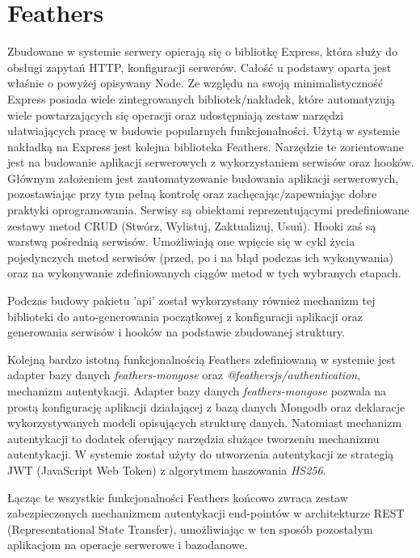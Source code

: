 \section{Feathers}
Zbudowane w systemie serwery opierają się o bibliotkę Express, która służy do obsługi zapytań HTTP, konfiguracji serwerów. Całość u podstawy oparta jest właśnie o powyżej opisywany Node. Ze względu na swoją minimalistyczność Express posiada wiele zintegrowanych bibliotek/nakładek, które automatyzują wiele powtarzających się operacji oraz udostępniają zestaw narzędzi ułatwiających pracę w budowie popularnych funkcjonalności. Użytą w systemie nakładką na Express jest kolejna biblioteka Feathers. Narzędzie te zorientowane jest na budowanie aplikacji serwerowych z wykorzystaniem serwisów oraz hooków. Głównym założeniem jest zautomatyzowanie budowania aplikacji serwerowych, pozostawiając przy tym pełną kontrolę oraz zachęcając/zapewniając dobre praktyki oprogramowania. Serwisy są obiektami reprezentującymi predefiniowane zestawy metod CRUD (Stwórz, Wylistuj, Zaktualizuj, Usuń). Hooki zaś są warstwą pośrednią serwisów. Umożliwiają one wpięcie się w cykl życia pojedynczych metod serwisów (przed, po i na błąd podczas ich wykonywania) oraz na wykonywanie zdefiniowanych ciągów metod w tych wybranych etapach. \cite{FeathersDocs}

Podczas budowy pakietu 'api' został wykorzystany również mechanizm tej biblioteki do auto-generowania początkowej z  konfiguracji aplikacji oraz generowania serwisów i hooków na podstawie zbudowanej struktury.

Kolejną bardzo istotną funkcjonalnością Feathers zdefiniowaną w systemie jest adapter bazy danych \textit{feathers-mongose} oraz \textit{@feathersjs/authentication}, mechanizm autentykacji. Adapter bazy danych \textit{feathers-mongose} pozwala na prostą konfigurację aplikacji działającej z bazą danych Mongodb oraz deklaracje wykorzystywanych modeli opisujących strukturę danych. Natomiast mechanizm autentykacji to dodatek oferujący narzędzia służące tworzeniu mechanizmu autentykacji. W systemie został użyty do utworzenia autentykacji ze strategią JWT (JavaScript Web Token) z algorytmem haszowania \textit{HS256}. 

Łącząc te wszystkie funkcjonalności Feathers końcowo zwraca zestaw zabezpieczonych mechanizmem autentykacji end-pointów w architekturze REST (Representational State Transfer), umożliwiając w ten sposób pozostałym aplikacjom na operacje serwerowe i bazodanowe.

